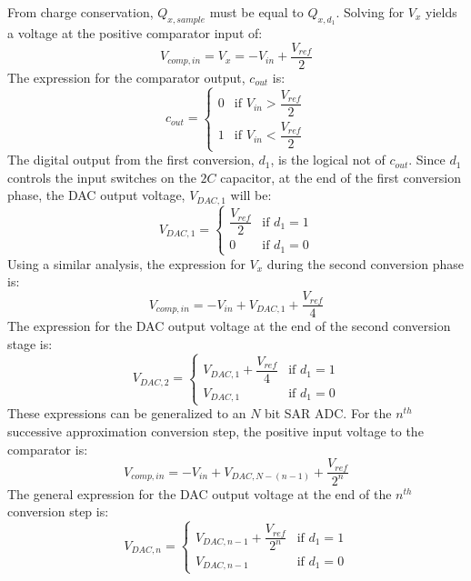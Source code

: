 From charge conservation, $Q_{x,sample}$ must be equal to $Q_{x,d_1}$. Solving for $V_{x}$ yields a voltage at the positive comparator input of:
\begin{equation}
\label{eq:sarmsbvoltage}
V_{comp,in} = V_{x} = -V_{in}+\dfrac{V_{ref}}{2}
\end{equation}
The expression for the comparator output, $c_{out}$ is:
\begin{equation}
\label{sard1}
c_{out} =	\begin{cases}
				0 & \mbox{if } V_{in} > \dfrac{V_{ref}}{2} \\[0.5em]
				1 & \mbox{if } V_{in} < \dfrac{V_{ref}}{2}
			\end{cases}
\end{equation}
The digital output from the first conversion, $d_{1}$, is the logical not of $c_{out}$. Since $d_{1}$  controls the input switches on the $2C$ capacitor, at the end of the first conversion phase, the DAC output voltage, $V_{DAC,1}$ will be:
\begin{equation}
V_{DAC,1} = \begin{cases}
				\dfrac{V_{ref}}{2} & \mbox{if } d_{1} = 1 \\[0.5em]
				0 & \mbox{if } d_{1} = 0
			\end{cases}
\end{equation}
Using a similar analysis, the expression for $V_{x}$ during the second conversion phase is:
\begin{equation}
V_{comp,in} = -V_{in}+V_{DAC,1}+\dfrac{V_{ref}}{4}
\end{equation}
The expression for the DAC output voltage at the end of the second conversion stage is:
\begin{equation}
V_{DAC,2} = \begin{cases}
				V_{DAC,1} + \dfrac{V_{ref}}{4} & \mbox{if } d_{1} = 1 \\[0.5em]
				V_{DAC,1} & \mbox{if } d_{1} = 0
			\end{cases}
\end{equation} 
These expressions can be generalized to an $N$ bit SAR ADC. For the $n^{th}$ successive approximation conversion step, the positive input voltage to the comparator is:
\begin{equation}
\label{eq:generalvcompin}
V_{comp,in} = -V_{in} + V_{DAC,N-(n-1)} + \dfrac{V_{ref}}{2^{n}}
\end{equation}
The general expression for the DAC output voltage at the end of the $n^{th}$ conversion step is:
\begin{equation}
V_{DAC,n} =	\begin{cases}
			V_{DAC,n-1} + \dfrac{V_{ref}}{2^{n}} & \mbox{if } d_{1} = 1 \\[0.5em]
			V_{DAC,n-1} & \mbox{if } d_{1} = 0
			\end{cases}
\end{equation}
